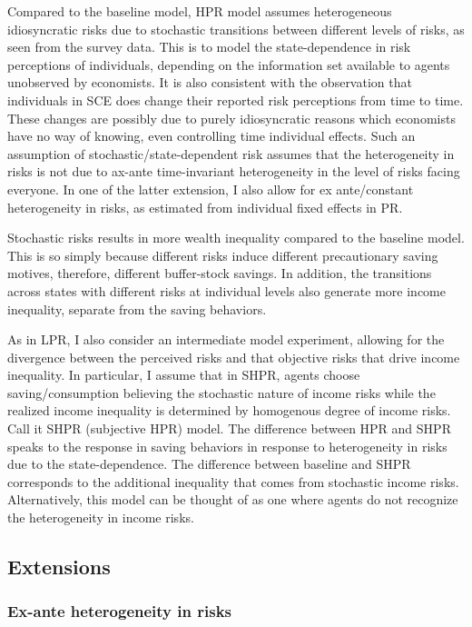 Compared to the baseline model, HPR model assumes heterogeneous idiosyncratic risks due to stochastic transitions between different levels of risks, as seen from the survey data. This is to model the state-dependence in risk perceptions of individuals, depending on the information set available to agents unobserved by economists. It is also consistent with the observation that individuals in SCE does change their reported risk perceptions from time to time. These changes are possibly due to purely idiosyncratic reasons which economists have no way of knowing, even controlling time individual effects. Such an assumption of stochastic/state-dependent risk assumes that the heterogeneity in risks is not due to ax-ante time-invariant heterogeneity in the level of risks facing everyone. In one of the latter extension, I also allow for ex ante/constant heterogeneity in risks, as estimated from individual fixed effects in PR.  

Stochastic risks results in more wealth inequality compared to the baseline model. This is so simply because different risks induce different precautionary saving motives, therefore, different buffer-stock savings. In addition, the transitions across states with different risks at individual levels also generate more income inequality, separate from the saving behaviors. 

As in LPR, I also consider an intermediate model experiment, allowing for the divergence between the perceived risks and that objective risks that drive income inequality. In particular, I assume that in SHPR, agents choose saving/consumption believing the stochastic nature of income risks while the realized income inequality is determined by homogenous degree of income risks. Call it SHPR (subjective HPR) model. The difference between HPR and SHPR speaks to the response in saving behaviors in response to heterogeneity in risks due to the state-dependence. The difference between baseline and SHPR corresponds to the additional inequality that comes from stochastic income risks.  Alternatively, this model can be thought of as one where agents do not recognize the heterogeneity in income risks. 

\subsection{Extensions}

\subsubsection{Ex-ante heterogeneity in risks}

